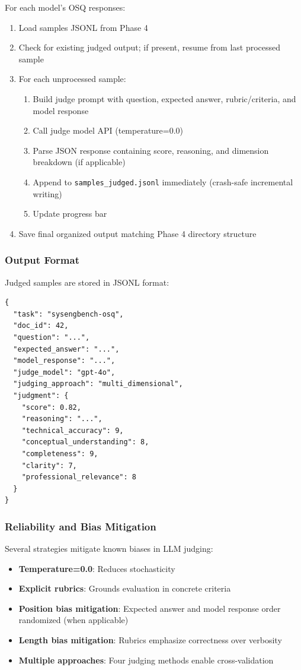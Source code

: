 For each model's OSQ responses:
\begin{enumerate}
    \item Load samples JSONL from Phase 4
    \item Check for existing judged output; if present, resume from last processed sample
    \item For each unprocessed sample:
    \begin{enumerate}
        \item Build judge prompt with question, expected answer, rubric/criteria, and model response
        \item Call judge model API (temperature=0.0)
        \item Parse JSON response containing score, reasoning, and dimension breakdown (if applicable)
        \item Append to \texttt{samples\_judged.jsonl} immediately (crash-safe incremental writing)
        \item Update progress bar
    \end{enumerate}
    \item Save final organized output matching Phase 4 directory structure
\end{enumerate}

\subsubsection{Output Format}

Judged samples are stored in JSONL format:
\begin{verbatim}
{
  "task": "sysengbench-osq",
  "doc_id": 42,
  "question": "...",
  "expected_answer": "...",
  "model_response": "...",
  "judge_model": "gpt-4o",
  "judging_approach": "multi_dimensional",
  "judgment": {
    "score": 0.82,
    "reasoning": "...",
    "technical_accuracy": 9,
    "conceptual_understanding": 8,
    "completeness": 9,
    "clarity": 7,
    "professional_relevance": 8
  }
}
\end{verbatim}

\subsubsection{Reliability and Bias Mitigation}

Several strategies mitigate known biases in LLM judging:
\begin{itemize}
    \item \textbf{Temperature=0.0}: Reduces stochasticity
    \item \textbf{Explicit rubrics}: Grounds evaluation in concrete criteria
    \item \textbf{Position bias mitigation}: Expected answer and model response order randomized (when applicable)
    \item \textbf{Length bias mitigation}: Rubrics emphasize correctness over verbosity
    \item \textbf{Multiple approaches}: Four judging methods enable cross-validation
\end{itemize}

